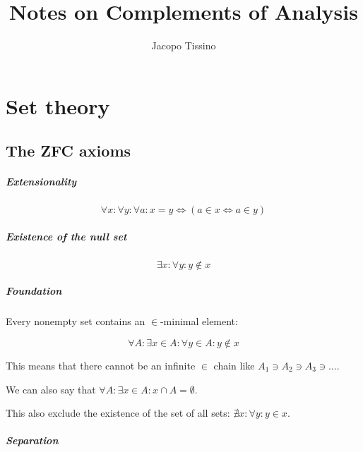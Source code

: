 \documentclass[12pt,a4paper]{report}
\author{Jacopo Tissino}
\title{Notes on Complements of Analysis}
\numberwithin{equation}{section}
\theoremstyle{definition}
\theoremstyle{remark}
\begin{document}
\maketitle

\chapter{Set theory}

\section{The ZFC axioms}

\paragraph{Extensionality}

\begin{equation}
\forall x: \forall y: \forall a: x=y \iff (a \in x \iff a \in y)
\end{equation}

\paragraph{Existence of the null set}

\begin{equation}
\exists x: \forall y: y \notin x
\end{equation}

\paragraph{Foundation}

Every nonempty set contains an $\in$-minimal element:

\begin{equation}
\forall A: \exists x \in A : \forall y \in A: y \notin x
\end{equation}

This means that there cannot be an infinite $\in$ chain like $A_1 \ni A_2 \ni A_3 \ni \dots$.

We can also say that $\forall A: \exists x \in A: x \cap A = \emptyset$.

This also exclude the existence of the set of all sets: $\nexists x: \forall y: y \in x$.

\paragraph{Separation}
\end{document}
